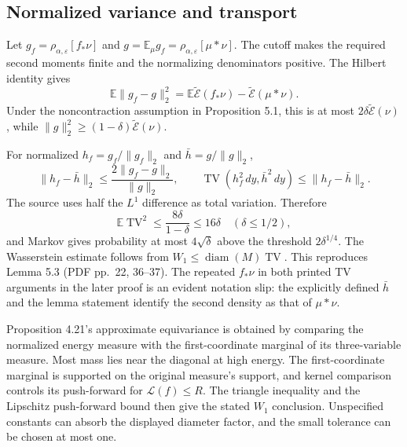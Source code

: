 \documentclass[10pt]{article}
\begin{document}
\subsection*{Normalized variance and transport}
Let \(g_f=\rho_{\alpha,\varepsilon}[f_*\nu]\) and \(g=\mathbb E_\mu g_f=\rho_{\alpha,\varepsilon}[\mu*\nu]\). The cutoff makes the required second moments finite and the normalizing denominators positive. The Hilbert identity gives \[\mathbb E\|g_f-g\|_2^2
 =\mathbb E\widetilde{\mathcal E}(f_*\nu)-\widetilde{\mathcal E}(\mu*\nu).\] Under the noncontraction assumption in Proposition 5.1, this is at most \(2\delta\widetilde{\mathcal E}(\nu)\), while \(\|g\|_2^2\ge(1-\delta)\widetilde{\mathcal E}(\nu)\).\par
For normalized \(h_f=g_f/\|g_f\|_2\) and \(\bar h=g/\|g\|_2\), \[\|h_f-\bar h\|_2\le
 \frac{2\|g_f-g\|_2}{\|g\|_2},\qquad
 \operatorname{TV}(h_f^2\,dy,\bar h^2\,dy)\le\|h_f-\bar h\|_2.\] The source uses half the \(L^1\) difference as total variation. Therefore \[\mathbb E\operatorname{TV}^2\le\frac{8\delta}{1-\delta}\le16\delta
 \quad(\delta\le1/2),\] and Markov gives probability at most \(4\sqrt\delta\) above the threshold \(2\delta^{1/4}\). The Wasserstein estimate follows from \(W_1\le\operatorname{diam}(M)\operatorname{TV}\). This reproduces Lemma 5.3 (PDF pp. 22, 36–37). The repeated \(f_*\nu\) in both printed TV arguments in the later proof is an evident notation slip: the explicitly defined \(\bar h\) and the lemma statement identify the second density as that of \(\mu*\nu\).\par
Proposition 4.21’s approximate equivariance is obtained by comparing the normalized energy measure with the first-coordinate marginal of its three-variable measure. Most mass lies near the diagonal at high energy. The first-coordinate marginal is supported on the original measure’s support, and kernel comparison controls its push-forward for \(\mathcal L(f)\le R\). The triangle inequality and the Lipschitz push-forward bound then give the stated \(W_1\) conclusion. Unspecified constants can absorb the displayed diameter factor, and the small tolerance can be chosen at most one.\par
\end{document}
